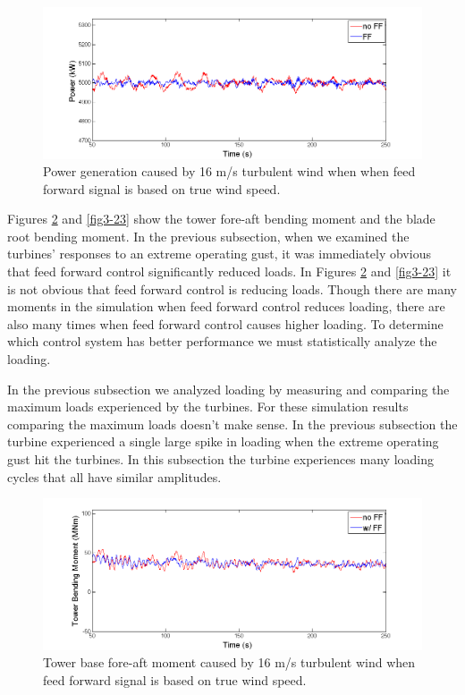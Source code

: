 \begin{figure}[htb]
	\centering
		\includegraphics[width = \linewidth]{Figures/ch3Figures/fig3-21.png}
		
	\caption{Power generation caused by 16 m/s turbulent wind when when feed forward signal is based on true wind speed.}
	\label{fig3-21}
\end{figure}

Figures \ref{fig3-22} and \ref{fig3-23} show the tower fore-aft bending moment and the blade root bending moment. In the previous subsection, when we examined the turbines' responses to an extreme operating gust, it was immediately obvious that feed forward control significantly reduced loads. In Figures \ref{fig3-22} and \ref{fig3-23} it is not obvious that feed forward control is reducing loads. Though there are many moments in the simulation when feed forward control reduces loading, there are also many times when feed forward control causes higher loading. To determine which control system has better performance we must statistically analyze the loading.

In the previous subsection we analyzed loading by measuring and comparing the maximum loads experienced by the turbines. For these simulation results comparing the maximum loads doesn't make sense. In the previous subsection the turbine experienced a single large spike in loading when the extreme operating gust hit the turbines. In this subsection the turbine experiences many loading cycles that all have similar amplitudes. 


\begin{figure}[htb]
	\centering
		\includegraphics[width = \linewidth]{Figures/ch3Figures/fig3-22.png}
		
	\caption{Tower base fore-aft moment caused by 16 m/s turbulent wind when feed forward signal is based on true wind speed.}
	\label{fig3-22}
\end{figure}

